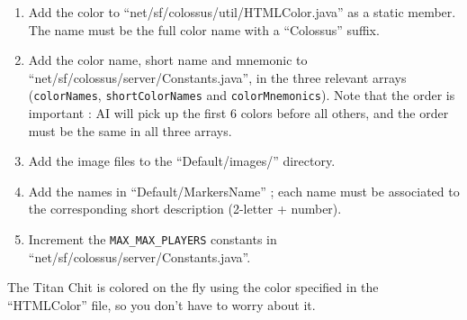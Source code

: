 \documentclass{article}
\begin{document}
\begin{enumerate}

\item Add the color to ``net/sf/colossus/util/HTMLColor.java'' as a static member. The name must be the full color name with a ``Colossus'' suffix.

\item Add the color name, short name and mnemonic to ``net/sf/colossus/server/Constants.java'', in the three relevant arrays (\texttt{colorNames}, \texttt{shortColorNames} and \texttt{colorMnemonics}). Note that the order is important : AI will pick up the first 6 colors before all others, and the order must be the same in all three arrays.

\item Add the image files to the ``Default/images/'' directory.

\item Add the names in ``Default/MarkersName'' ; each name must be associated to the corresponding short description (2-letter + number).

\item Increment the \texttt{MAX\_MAX\_PLAYERS} constants in ``net/sf/colossus/server/Constants.java''.

\end{enumerate}

The Titan Chit is colored on the fly using the color specified in the ``HTMLColor'' file, so you don't have to worry about it.
\end{document}
